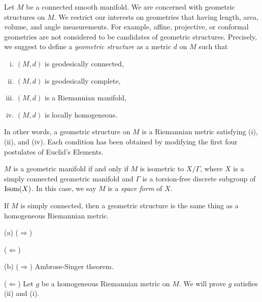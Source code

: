 \documentclass{../note}
\begin{document}
\begin{prb}
Let $M$ be a connected smooth manifold.
We are concerned with geometric structures on $M$.
We restrict our interests on geometries that having length, area, volume, and angle measurements.
For example, affine, projective, or conformal geometries are not considered to be candidates of geometric structures.
Precisely, we suggest to define a \emph{geometric structure} as a metric $d$ on $M$ such that
\begin{enumerate}[(i)]
\item $(M,d)$ is geodesically connected,
\item $(M,d)$ is geodesically complete,
\item $(M,d)$ is a Riemannian manifold,
\item $(M,d)$ is locally homogeneous.
\end{enumerate}
In other words, a geometric structure on $M$ is a Riemannian metric satisfying (i), (ii), and (iv).
Each condition has been obtained by modifying the first four postulates of Euclid's Elements.
\begin{parts}
\item $M$ is a geometric manifold if and only if $M$ is isometric to $X/\Gamma$, where $X$ is a simply connected geometric manifold and $\Gamma$ is a torsion-free discrete subgroup of $\operatorname{Isom}(X)$. In this case, we say $M$ is a \emph{space form} of $X$.
\item If $M$ is simply connected, then a geometric structure is the same thing as a homogeneous Riemannian metric.
\end{parts}
\end{prb}
\begin{pf}
(a) %
($\Rightarrow$)

($\Leftarrow$)

(b)
($\Rightarrow$)
Ambrose-Singer theorem.

($\Leftarrow$)
Let $g$ be a homogeneous Riemannian metric on $M$.
We will prove $g$ satisfies (ii) and (i).
\end{pf}
\end{document}
